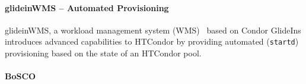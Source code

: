 \documentclass{sig-alternate}
\begin{document}
%
\paragraph{glideinWMS -- Automated \pilot Provisioning}

glideinWMS, a workload management system (WMS)~\cite{1742-6596-119-6-062044}
based on Condor GlideIns introduces advanced \pilotjob capabilities to HTCondor
by providing automated \pilot (\texttt{startd}) provisioning based on the state
of an HTCondor pool.


%
\paragraph{BoSCO}


\end{document}
